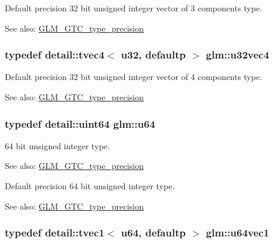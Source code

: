 Default precision 32 bit unsigned integer vector of 3 components type. \begin{Desc}
\item[See also:]\hyperlink{group__gtc__type__precision}{GLM\_\-GTC\_\-type\_\-precision} \end{Desc}
\hypertarget{group__gtc__type__precision_g7e4574f8327a2f576baf2617343d0170}{
\subsubsection[u32vec4]{\setlength{\rightskip}{0pt plus 5cm}typedef detail::tvec4$<$ u32, defaultp $>$ {\bf glm::u32vec4}}}
\label{group__gtc__type__precision_g7e4574f8327a2f576baf2617343d0170}


Default precision 32 bit unsigned integer vector of 4 components type. \begin{Desc}
\item[See also:]\hyperlink{group__gtc__type__precision}{GLM\_\-GTC\_\-type\_\-precision} \end{Desc}
\hypertarget{group__gtc__type__precision_g71cedd4972f9cb1a5e14dfe5ab83ecd7}{
\subsubsection[u64]{\setlength{\rightskip}{0pt plus 5cm}typedef detail::uint64 {\bf glm::u64}}}
\label{group__gtc__type__precision_g71cedd4972f9cb1a5e14dfe5ab83ecd7}


64 bit unsigned integer type. \begin{Desc}
\item[See also:]\hyperlink{group__gtc__type__precision}{GLM\_\-GTC\_\-type\_\-precision}\end{Desc}
Default precision 64 bit unsigned integer type. \begin{Desc}
\item[See also:]\hyperlink{group__gtc__type__precision}{GLM\_\-GTC\_\-type\_\-precision} \end{Desc}
\hypertarget{group__gtc__type__precision_g7d5145019ad749f4becd39ce8e786a5f}{
\subsubsection[u64vec1]{\setlength{\rightskip}{0pt plus 5cm}typedef detail::tvec1$<$ u64, defaultp $>$ {\bf glm::u64vec1}}}
\label{group__gtc__type__precision_g7d5145019ad749f4becd39ce8e786a5f}


